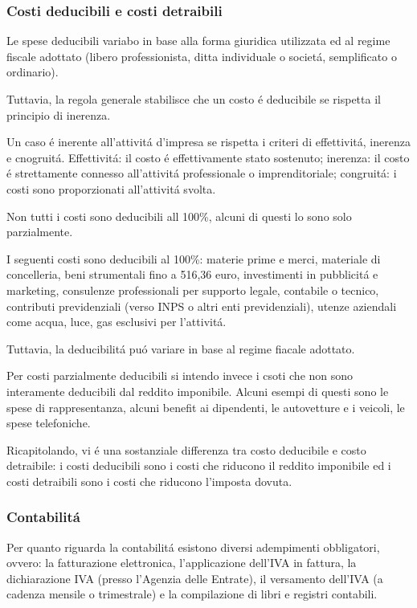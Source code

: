 \documentclass{article}
\begin{document}
\subsubsection{Costi deducibili e costi detraibili}
Le spese deducibili variabo in base  alla forma giuridica utilizzata ed al regime fiscale adottato  (libero professionista, ditta individuale o societ\'a, semplificato o ordinario). 

Tuttavia, la regola generale stabilisce che un costo \'e deducibile se rispetta il principio di inerenza.

Un caso \'e inerente all'attivit\'a d'impresa se rispetta i criteri di effettivit\'a, inerenza e cnogruit\'a. 
Effettivit\'a: il costo \'e effettivamente stato sostenuto; inerenza: il costo \'e strettamente connesso all'attivit\'a professionale o imprenditoriale; congruit\'a: i costi sono proporzionati all'attivit\'a svolta.

Non tutti i costi sono deducibili all 100\%, alcuni di questi lo sono solo parzialmente.

I seguenti costi sono deducibili al 100\%: materie prime e merci, materiale di concelleria, beni strumentali fino a 516,36 euro, investimenti in pubblicit\'a e marketing, consulenze professionali per supporto legale, contabile o tecnico, contributi previdenziali (verso INPS o altri enti previdenziali), utenze aziendali come acqua, luce, gas esclusivi per l'attivit\'a.

Tuttavia, la deducibilit\'a pu\'o variare in base al regime fiacale adottato.

Per costi parzialmente deducibili si intendo invece i csoti che non sono interamente deducibili dal reddito imponibile. Alcuni esempi di questi sono le spese di rappresentanza, alcuni benefit ai dipendenti, le autovetture e i veicoli, le spese telefoniche.

Ricapitolando, vi \'e una sostanziale differenza tra costo deducibile e costo detraibile: i costi deducibili sono i costi che riducono il reddito imponibile ed i costi detraibili sono i costi che riducono l'imposta dovuta.

\subsubsection{Contabilit\'a}
Per quanto riguarda la contabilit\'a esistono diversi adempimenti obbligatori, ovvero: la fatturazione elettronica, l'applicazione dell'IVA in fattura, la dichiarazione IVA (presso l'Agenzia delle Entrate), il versamento dell'IVA (a cadenza mensile o trimestrale)
e la compilazione di libri e registri contabili.
\end{document}
